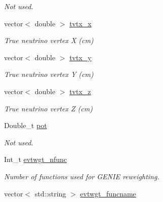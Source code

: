 \begin{DoxyCompactItemize}
\begin{DoxyCompactList}\small\item\em Not used. \end{DoxyCompactList}\item 
\hypertarget{classUBXSecEvent_a75b4a2318b7f7f187acdc33622a4795e}{vector$<$ double $>$ \hyperlink{classUBXSecEvent_a75b4a2318b7f7f187acdc33622a4795e}{tvtx\-\_\-x}}\label{classUBXSecEvent_a75b4a2318b7f7f187acdc33622a4795e}

\begin{DoxyCompactList}\small\item\em True neutrino vertex X (cm) \end{DoxyCompactList}\item 
\hypertarget{classUBXSecEvent_aa6532549e8c9763ae285a98976a80a94}{vector$<$ double $>$ \hyperlink{classUBXSecEvent_aa6532549e8c9763ae285a98976a80a94}{tvtx\-\_\-y}}\label{classUBXSecEvent_aa6532549e8c9763ae285a98976a80a94}

\begin{DoxyCompactList}\small\item\em True neutrino vertex Y (cm) \end{DoxyCompactList}\item 
\hypertarget{classUBXSecEvent_afcae666a9433c56792d47c53856d66ac}{vector$<$ double $>$ \hyperlink{classUBXSecEvent_afcae666a9433c56792d47c53856d66ac}{tvtx\-\_\-z}}\label{classUBXSecEvent_afcae666a9433c56792d47c53856d66ac}

\begin{DoxyCompactList}\small\item\em True neutrino vertex Z (cm) \end{DoxyCompactList}\item 
\hypertarget{classUBXSecEvent_ad783d4eedd7be14db4d5b7b9cb2d144a}{Double\-\_\-t \hyperlink{classUBXSecEvent_ad783d4eedd7be14db4d5b7b9cb2d144a}{pot}}\label{classUBXSecEvent_ad783d4eedd7be14db4d5b7b9cb2d144a}

\begin{DoxyCompactList}\small\item\em Not used. \end{DoxyCompactList}\item 
\hypertarget{classUBXSecEvent_a81ea8ff46aefd7d7ed3353c7c6416d2f}{Int\-\_\-t \hyperlink{classUBXSecEvent_a81ea8ff46aefd7d7ed3353c7c6416d2f}{evtwgt\-\_\-nfunc}}\label{classUBXSecEvent_a81ea8ff46aefd7d7ed3353c7c6416d2f}

\begin{DoxyCompactList}\small\item\em Number of functions used for G\-E\-N\-I\-E reweighting. \end{DoxyCompactList}\item 
\hypertarget{classUBXSecEvent_a729fecbcaf9884973196b10131a418fe}{vector$<$ std\-::string $>$ \hyperlink{classUBXSecEvent_a729fecbcaf9884973196b10131a418fe}{evtwgt\-\_\-funcname}}\label{classUBXSecEvent_a729fecbcaf9884973196b10131a418fe}


\end{DoxyCompactItemize}
